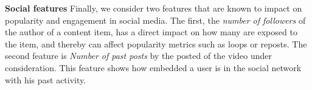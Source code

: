 	\noindent\textbf{Social  features} Finally, we consider two features that are known to impact on popularity and engagement in social media. The first, the \emph{number of followers} of the author of a content item, has a direct impact on how many are exposed to the item, and thereby can affect popularity metrics such as loops or reposts. The second feature is \emph{Number of past posts} by the posted of the video under consideration. This feature shows how embedded a user is in the social network with his past activity.

%
%
